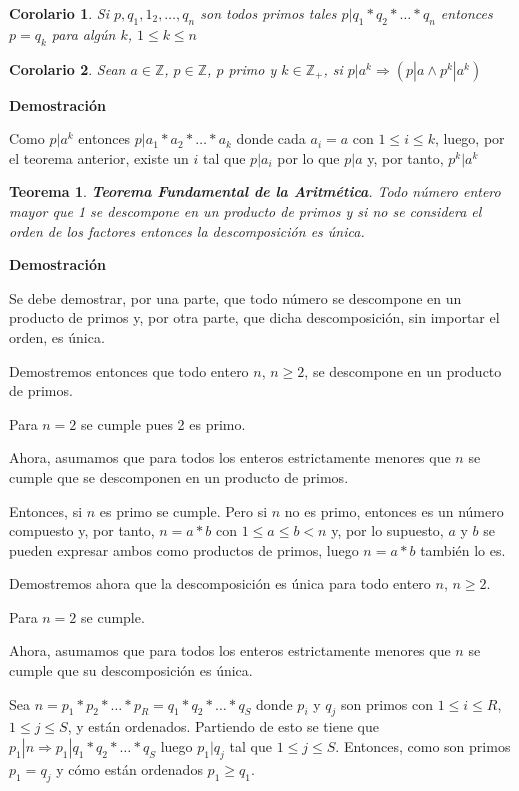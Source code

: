 \documentclass[a4paper,12pt]{report}
\newtheorem*{teo}{Teorema}
\newtheorem*{cor}{Corolario}
\begin{document}
\begin{cor}
 Si $p,q_1,1_2,\dots,q_n$ son todos primos tales $p|q_1*q_2*\dots*q_n$ entonces $p=q_k$ para algún $k$, $1\leq k \leq n$
\end{cor}


\begin{cor}
 Sean $a\in\mathbb{Z}$, $p\in\mathbb{Z}$, $p$ primo y $k\in\mathbb{Z}_+$, si $p|a^k\Rightarrow (p|a\wedge p^k|a^k)$
\end{cor}

\textbf{Demostración}

Como $p|a^k$ entonces $p|a_1*a_2*\dots *a_k$ donde cada $a_i=a$ con $1\leq i \leq k$, luego, por el teorema anterior, existe un $i$ tal que $p|a_i$ por lo que $p|a$  y, por tanto, $p^k|a^k$

\begin{teo}
 \textbf{Teorema Fundamental de la Aritmética}. Todo número entero mayor que 1 se descompone en un producto de primos y si no se considera el orden de los factores entonces la descomposición es única.
\end{teo}

\textbf{Demostración}

Se debe demostrar, por una parte, que todo número se descompone en un producto de primos y, por otra parte, que dicha descomposición, sin importar el orden, es única. 

Demostremos entonces que todo entero $n$, $n\geq 2$, se descompone en un producto de primos.

Para $n=2$ se cumple pues 2 es primo.

Ahora, asumamos que para todos los enteros estrictamente menores que $n$ se cumple que se descomponen en un producto de primos.

Entonces, si  $n$ es primo se cumple. Pero si $n$ no es primo, entonces es un número compuesto y, por tanto, $n=a*b$ con $1\leq a \leq b <n$ y, por lo supuesto, $a$ y $b$ se pueden expresar ambos como productos de primos, luego $n=a*b$ también lo es.

Demostremos ahora que la descomposición es única para todo entero $n$, $n\geq 2$.

Para $n=2$ se cumple.

Ahora, asumamos que para todos los enteros estrictamente menores que $n$ se cumple que su descomposición es única.

Sea $n=p_1*p_2*\dots *p_R=q_1*q_2*\dots *q_S$ donde $p_i$ y $q_j$ son primos con  $1\leq i \leq R$, $1\leq j \leq S$, y están ordenados. Partiendo de esto se tiene que $p_1|n \Rightarrow p_1|q_1*q_2*\dots *q_S$ luego $p_1|q_j$ tal que $1\leq j \leq S$. Entonces, como son primos $p_1=q_j$ y cómo están ordenados $p_1\geq q_1$.
\end{document}
